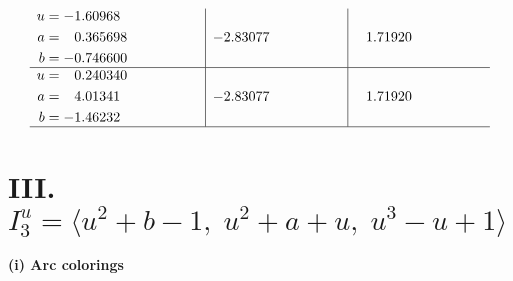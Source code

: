 \documentclass[1p]{elsarticle_modified}
\theoremstyle{definition}
\begin{document}
$$\begin{array}{c|c|c}
\begin{aligned}
u &= -1.60968\phantom{ +0.000000I} \\
a &= \phantom{-}0.365698\phantom{ +0.000000I} \\
b &= -0.746600\phantom{ +0.000000I}\end{aligned}
 & -2.83077\phantom{ +0.000000I} & \phantom{-}1.71920\phantom{ +0.000000I} \\ \hline\begin{aligned}
u &= \phantom{-}0.240340\phantom{ +0.000000I} \\
a &= \phantom{-}4.01341\phantom{ +0.000000I} \\
b &= -1.46232\phantom{ +0.000000I}\end{aligned}
 & -2.83077\phantom{ +0.000000I} & \phantom{-}1.71920\phantom{ +0.000000I}\\
 \hline 
 \end{array}$$\newpage\newpage\renewcommand{\arraystretch}{1}
\centering \section*{III. $I^u_{3}= \langle u^2+b-1,\;u^2+a+u,\;u^3- u+1 \rangle$}
\flushleft \textbf{(i) Arc colorings}\\
\end{document}
